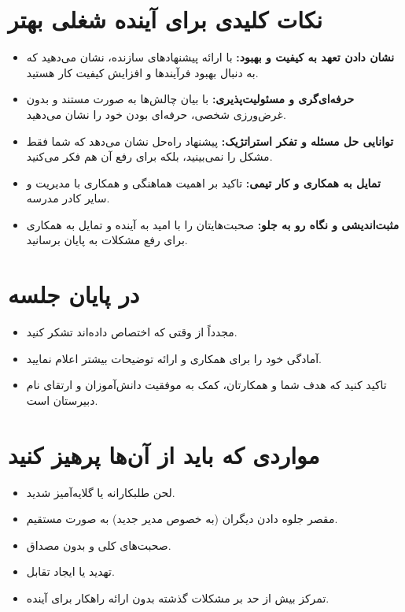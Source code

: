 \documentclass[12pt]{article}
\begin{document}
\section*{نکات کلیدی برای آینده شغلی بهتر}
\begin{itemize}
    \item \textbf{نشان دادن تعهد به کیفیت و بهبود:} با ارائه پیشنهادهای سازنده، نشان می‌دهید که به دنبال بهبود فرآیندها و افزایش کیفیت کار هستید.
    \item \textbf{حرفه‌ای‌گری و مسئولیت‌پذیری:} با بیان چالش‌ها به صورت مستند و بدون غرض‌ورزی شخصی، حرفه‌ای بودن خود را نشان می‌دهید.
    \item \textbf{توانایی حل مسئله و تفکر استراتژیک:} پیشنهاد راه‌حل نشان می‌دهد که شما فقط مشکل را نمی‌بینید، بلکه برای رفع آن هم فکر می‌کنید.
    \item \textbf{تمایل به همکاری و کار تیمی:} تاکید بر اهمیت هماهنگی و همکاری با مدیریت و سایر کادر مدرسه.
    \item \textbf{مثبت‌اندیشی و نگاه رو به جلو:} صحبت‌هایتان را با امید به آینده و تمایل به همکاری برای رفع مشکلات به پایان برسانید.
\end{itemize}

\section*{در پایان جلسه}
\begin{itemize}
    \item مجدداً از وقتی که اختصاص داده‌اند تشکر کنید.
    \item آمادگی خود را برای همکاری و ارائه توضیحات بیشتر اعلام نمایید.
    \item تاکید کنید که هدف شما و همکارتان، کمک به موفقیت دانش‌آموزان و ارتقای نام دبیرستان است.
\end{itemize}

\section*{مواردی که باید از آن‌ها پرهیز کنید}
\begin{itemize}
    \item لحن طلبکارانه یا گلایه‌آمیز شدید.
    \item مقصر جلوه دادن دیگران (به خصوص مدیر جدید) به صورت مستقیم.
    \item صحبت‌های کلی و بدون مصداق.
    \item تهدید یا ایجاد تقابل.
    \item تمرکز بیش از حد بر مشکلات گذشته بدون ارائه راهکار برای آینده.
\end{itemize}
\end{document}

